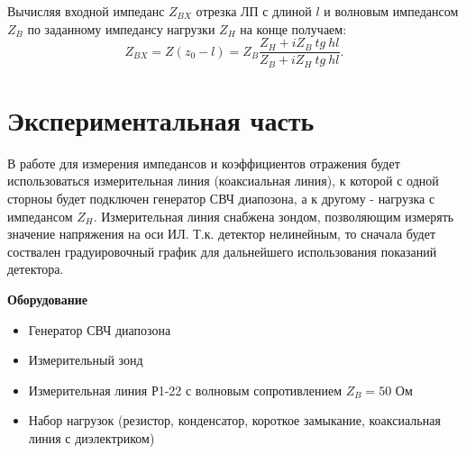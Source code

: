 Вычисляя входной импеданс $Z_{BX}$ отрезка ЛП с длиной $l$ и волновым импедансом $Z_B$ по заданному импедансу нагрузки
$Z_H$ на конце получаем:
\begin{equation}
    Z_{BX} = Z(z_0-l)=Z_B \frac{Z_H+iZ_B~tg~hl}{Z_B+iZ_H~tg~hl}.
    \label{eq:20}
\end{equation}


\newpage

\section{Экспериментальная часть}
В работе для измерения импедансов и коэффициентов отражения будет использоваться измерительная линия (коаксиальная
линия), к которой с одной сторноы будет подключен генератор СВЧ диапозона, а к другому - нагрузка с импедансом $Z_H$. 
Измерительная линия снабжена зондом, позволяющим измерять значение напряжения на оси ИЛ. Т.к. детектор нелинейным, то
сначала будет соствален градуировочный график для дальнейшего использования показаний детектора.

\textbf{Оборудование}
\begin{itemize}
    \item Генератор СВЧ диапозона
    \item Измерительный зонд 
    \item Измерительная линия  Р1-22 с волновым сопротивлением $Z_B = 50$ Ом    
    \item Набор нагрузок (резистор, конденсатор, короткое замыкание, коаксиальная линия с диэлектриком)
\end{itemize}

